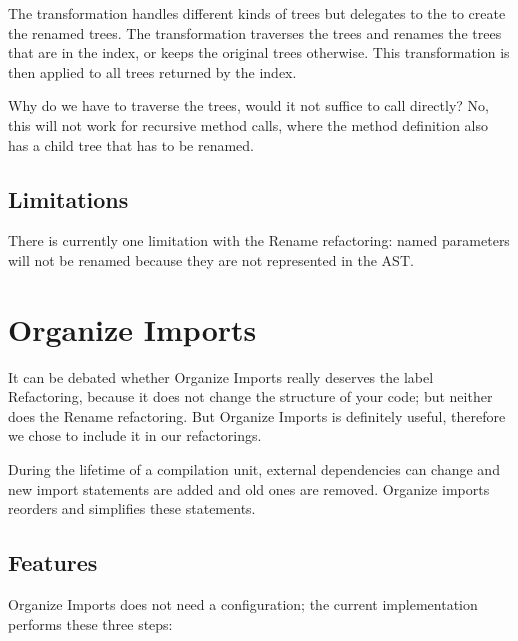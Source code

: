 \documentclass[10pt,a4paper,oneside]{scrreprt}
\begin{document}
The  transformation handles different kinds of trees but delegates to the  to create the renamed trees. The  transformation traverses the trees and renames the trees that are in the index, or keeps the original trees otherwise. This transformation is then applied to all trees returned by the index.

Why do we have to traverse the trees, would it not suffice to call  directly? No, this will not work for recursive method calls, where the method definition also has a child tree that has to be renamed.

\subsection{Limitations}

There is currently one limitation with the Rename refactoring: named parameters will not be renamed because they are not represented in the AST.

\section{Organize Imports}

It can be debated whether Organize Imports really deserves the label Refactoring, because it does not change the structure of your code; but neither does the Rename refactoring. But Organize Imports is definitely useful, therefore we chose to include it in our refactorings.

During the lifetime of a compilation unit, external dependencies can change and new import statements are added and old ones are removed. Organize imports reorders and simplifies these statements.

\subsection{Features}

Organize Imports does not need a configuration; the current implementation performs these three steps:
\end{document}
